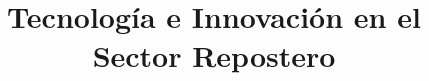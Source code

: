 \documentclass{bmcart}
\begin{document}
\begin{frontmatter}

\begin{fmbox}


\title{Tecnología e Innovación en el Sector Repostero
}


\author[
   addressref={aff1},                   %
   corref={aff1},                       %
   noteref={n1},                        %
   email={jaqueline.rodriguez.133@gmail.com}   %
]{ }



\address[id=aff1]{%
  , %
  \street{},                     %
  ,                              %
}
\address[id=aff2]{%
  \orgname{},
  \street{},
  \postcode{}
  \city{},
  \cny{}
}



\end{fmbox}
\end{frontmatter}
\end{document}
